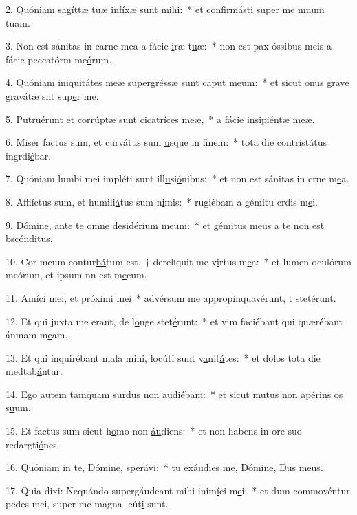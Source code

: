 2. Quóniam sagíttæ tuæ inf\uline{í}xæ sunt m\uline{i}hi:~* et confirmásti super me mnum t\uline{u}am.\par 
3. Non est sánitas in carne mea a fácie \uline{i}ræ t\uline{u}æ:~* non est pax óssibus meis a fácie peccatórm me\uline{ó}rum.\par 
4. Quóniam iniquitátes meæ supergréssæ sunt c\uline{a}put m\uline{e}um:~* et sicut onus grave gravátæ snt sup\uline{e}r me.\par 
5. Putruérunt et corrúptæ sunt cicatr\uline{í}ces m\uline{e}æ,~* a fácie insipiéntæ m\uline{e}æ.\par 
6. Miser factus sum, et curvátus sum \uline{u}sque in f\uline{i}nem:~* tota die contristátus ingrdi\uline{é}bar.\par 
7. Quóniam lumbi mei impléti sunt ill\uline{u}si\uline{ó}nibus:~* et non est sánitas in crne m\uline{e}a.\par 
8. Afflíctus sum, et humili\uline{á}tus sum n\uline{i}mis:~* rugiébam a gémitu crdis m\uline{e}i.\par 
9. Dómine, ante te omne desid\uline{é}rium m\uline{e}um:~* et gémitus meus a te non est bscónd\uline{i}tus.\par 
10. Cor meum contur\uline{bá}tum est,~† derelíquit me v\uline{i}rtus m\uline{e}a:~* et lumen oculórum meórum, et ipsum nn est m\uline{e}cum.\par 
11. Amíci mei, et pr\uline{ó}ximi m\uline{e}i~* advérsum me appropinquavérunt, t stet\uline{é}runt.\par 
12. Et qui juxta me erant, de l\uline{o}nge stet\uline{é}runt:~* et vim faciébant qui quærébant ánmam m\uline{e}am.\par 
13. Et qui inquirébant mala mihi, locúti sunt v\uline{a}nit\uline{á}tes:~* et dolos tota die medtab\uline{á}ntur.\par 
14. Ego autem tamquam surdus non \uline{au}di\uline{é}bam:~* et sicut mutus non apérins os s\uline{u}um.\par 
15. Et factus sum sicut h\uline{o}mo non \uline{áu}diens:~* et non habens in ore suo redargti\uline{ó}nes.\par 
16. Quóniam in te, Dómin\uline{e}, sper\uline{á}vi:~* tu exáudies me, Dómine, Dus m\uline{e}us.\par 
17. Quia dixi: Nequándo supergáudeant mihi inim\uline{í}ci m\uline{e}i:~* et dum commovéntur pedes mei, super me magna lcút\uline{i} sunt.\par 
